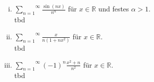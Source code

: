 \documentclass[11pt,a4paper,ngerman]{article}
\begin{document}
\begin{enumerate}[(i)]

    \item $\overset{\infty}{\underset{n=1}{\sum}} \frac{\sin(nx)}{n^\alpha}$ für $x\in\mathbb{R}$ und festes $\alpha > 1$.\\
        tbd

    \item $\overset{\infty}{\underset{n=1}{\sum}} \frac{x}{n(1+nx^2)}$ für $x\in\mathbb{R}$.\\
        tbd

    \item $\overset{\infty}{\underset{n=1}{\sum}} (-1)^n \frac{x^2+n}{n^2}$ für $x\in\mathbb{R}$.\\
        tbd

\end{enumerate}

\label{LastPage}
\end{document}
